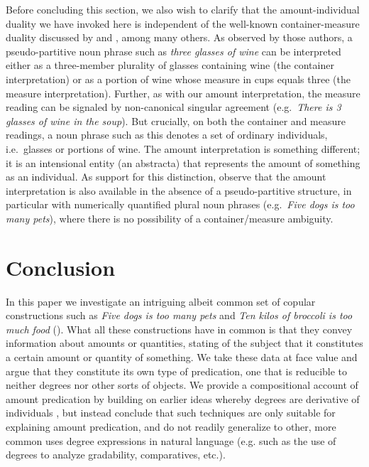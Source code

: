 \documentclass[a4paper,12pt,twoside]{article}
\begin{document}
	Before concluding this section, we also wish to clarify that the amount-individual duality we have invoked here is independent of the well-known container-measure duality discussed by \cite{Partee&Borschev:2004} and \cite{Rothstein:2017}, among many others. As observed by those authors, a pseudo-partitive noun phrase such as \textit{three glasses of wine} can be interpreted either as a three-member plurality of glasses containing wine  (the container interpretation) or as a portion of wine whose measure in cups equals three (the measure interpretation). 
	Further, as with our amount interpretation,  the measure reading can be signaled by non-canonical singular agreement (e.g.\ \textit{There is 3 glasses of wine in the soup}). But crucially, on both the container and measure readings, a noun phrase such as this denotes a set of ordinary individuals, i.e.\ glasses or portions of wine. The amount interpretation is something different; it is an intensional entity (an abstracta) that represents the amount of something as an individual. As support for this distinction, observe  that the amount interpretation is also available in the absence of a pseudo-partitive structure, in particular with numerically quantified plural noun phrases (e.g.\ \textit{Five dogs is too many pets}), where there is no possibility of a container/measure ambiguity.
	

	\section{Conclusion}
	
	In this paper we investigate an intriguing albeit common set of copular constructions such as \textit{Five dogs is too many pets} and \textit{Ten kilos of broccoli is too much food} (\citealt{Rett:2014,Mendia&Espinal:2024a}). What all these constructions have in common is that they convey information about amounts or quantities, stating of the subject that it constitutes a certain amount or quantity of something. We take these data at face value and argue that they constitute its own type of predication, one that is reducible to neither degrees nor other sorts of objects. We provide a compositional account of amount predication by building on earlier ideas whereby degrees are derivative of individuals \citep{Scontras:2017,Rothstein:2017}, but instead conclude that such techniques are only suitable for explaining amount predication, and do not readily generalize to other, more common uses degree expressions in natural language (e.g. such as the use of degrees to analyze gradability, comparatives, etc.).
\end{document}
